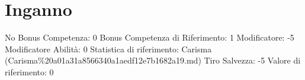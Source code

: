 \section{Inganno}\label{inganno}

\begin{description}
\tightlist
\item[Tags: ABI]
No Bonus Competenza: 0 Bonus Competenza di Riferimento: 1 Modificatore:
-5 Modificatore Abilità: 0 Statistica di riferimento: Carisma
(Carisma\%20a01a31a8566340a1aedf12e7b1682a19.md) Tiro Salvezza: -5
Valore di riferimento: 0
\end{description}
